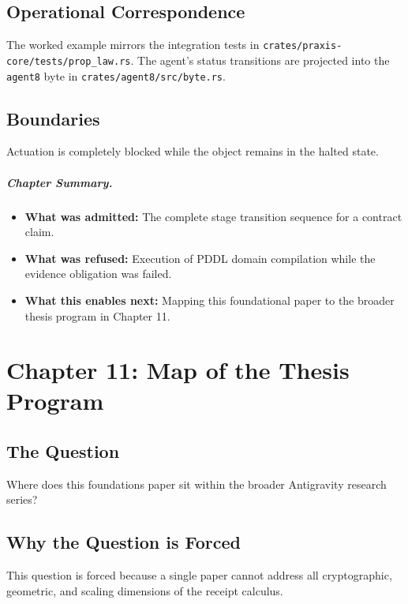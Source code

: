 \documentclass[11pt,oneside]{book}
\theoremstyle{definition}
\theoremstyle{plain}
\theoremstyle{remark}
\newcommand{\code}[1]{\texttt{#1}}
\begin{document}
\section{Operational Correspondence}
The worked example mirrors the integration tests in \code{crates/praxis-core/tests/prop\_law.rs}. %
The agent's status transitions are projected into the \code{agent8} byte in \code{crates/agent8/src/byte.rs}. %

\section{Boundaries}
Actuation is completely blocked while the object remains in the halted state. %

\paragraph{Chapter Summary.}
\begin{itemize}
  \item \textbf{What was admitted:} The complete stage transition sequence for a contract claim. %
  \item \textbf{What was refused:} Execution of PDDL domain compilation while the evidence obligation was failed. %
  \item \textbf{What this enables next:} Mapping this foundational paper to the broader thesis program in Chapter 11. %
\end{itemize}

\chapter{Chapter 11: Map of the Thesis Program}
\label{ch:thesis_map}

\section{The Question}
Where does this foundations paper sit within the broader Antigravity research series? %

\section{Why the Question is Forced}
This question is forced because a single paper cannot address all cryptographic, geometric, and scaling dimensions of the receipt calculus. %
\end{document}
